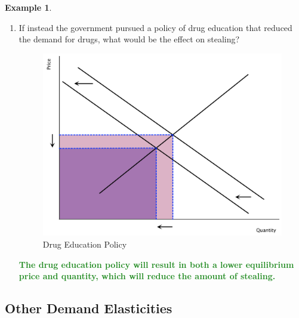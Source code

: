 \documentclass[11pt]{article}\usepackage[]{graphicx}\usepackage[]{color}
\theoremstyle{definition}
\newtheorem{exmp}{Example}[section]
\newcommand{\ddp}[1]{{\textbf{\textcolor{ForestGreen}{#1}}}}
\begin{document}
\begin{exmp}
\begin{enumerate}
			\item If instead the government pursued a policy of drug education that reduced the demand for drugs, what would be the effect on stealing? 
			
				\begin{figure}[H]
					\centering
					\includegraphics[scale=.40]{plot33.pdf}
					\caption{Drug Education Policy}
				\end{figure}
				
				\ddp{The drug education policy will result in both a lower equilibrium price and quantity, which will reduce the amount of stealing.}
			
		\end{enumerate}
	\end{exmp}
	
	\subsection{Other Demand Elasticities}
	
\end{document}
